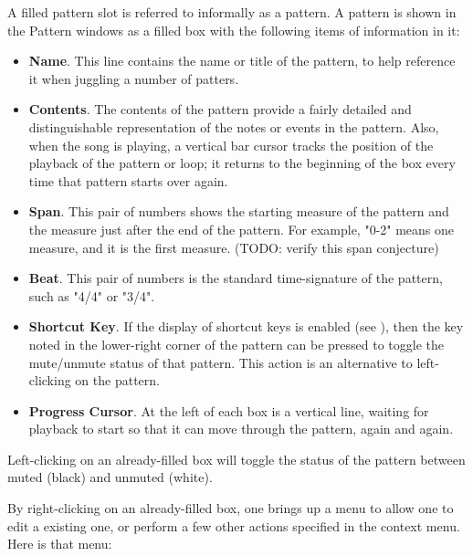    A filled pattern slot is referred to informally as a pattern.
   A pattern is shown in the Pattern windows as a filled box with the
   following items of information in it:

   \begin{itemize}
      \item \textbf{Name}.
         This line contains the name or title of the pattern, to help
         reference it when juggling a number of patters.
      \item \textbf{Contents}.
         The contents of the pattern provide a fairly detailed and
         distinguishable representation of the notes or events in the
         pattern.  Also, when the song is playing, a vertical bar cursor
         tracks the position of the playback of the pattern or loop; it
         returns to the beginning of the box every time that pattern starts
         over again.
      \item \textbf{Span}.
         This pair of numbers shows the starting measure of the pattern and
         the measure just after the end of the pattern.
         For example, "0-2" means one measure, and it is the first measure.
          (TODO:  verify this span conjecture)
      \item \textbf{Beat}.
         This pair of numbers is the standard time-signature of the pattern,
         such as "4/4" or "3/4".
      \item \textbf{Shortcut Key}.
         If the display of shortcut keys is enabled (see
         ),
         then the key noted in the lower-right corner of the pattern can be
         pressed to toggle the mute/unmute status of that pattern.
         This action is an alternative to left-clicking on the pattern.
      \item \textbf{Progress Cursor}.
         At the left of each box is a vertical line, waiting for playback to
         start so that it can move through the pattern, again and again.
   \end{itemize}

   Left-clicking on an already-filled box will toggle the status of the
   pattern between muted (black) and unmuted (white).

   By right-clicking on an already-filled box, one brings up a menu
   to allow one to edit a existing one, or perform a few other actions
   specified in the context menu.  Here is that menu:

